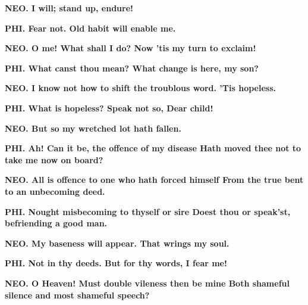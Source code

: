 \documentclass[11pt,letter]{book}
\begin{document}
\par \textbf{NEO. I will; stand up, endure!}
\par 

\par \textbf{PHI. Fear not. Old habit will enable me.}
\par 

\par \textbf{NEO. O me! What shall I do? Now ’tis my turn to exclaim!}
\par 

\par \textbf{PHI. What canst thou mean? What change is here, my son?}
\par 

\par \textbf{NEO. I know not how to shift the troublous word. ’Tis hopeless.}
\par 

\par \textbf{PHI. What is hopeless? Speak not so, Dear child!}
\par 

\par \textbf{NEO. But so my wretched lot hath fallen.}
\par 

\par \textbf{PHI. Ah! Can it be, the offence of my disease Hath moved thee not to take me now on board?}
\par 

\par \textbf{NEO. All is offence to one who hath forced himself From the true bent to an unbecoming deed.}
\par 

\par \textbf{PHI. Nought misbecoming to thyself or sire Doest thou or speak’st, befriending a good man.}
\par 

\par \textbf{NEO. My baseness will appear. That wrings my soul.}
\par 

\par \textbf{PHI. Not in thy deeds. But for thy words, I fear me!}
\par 

\par \textbf{NEO. O Heaven! Must double vileness then be mine Both shameful silence and most shameful speech?}
\par 
\end{document}
